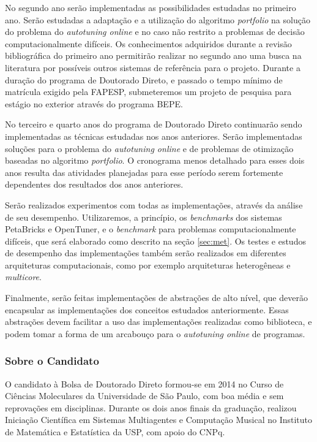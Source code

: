 \documentclass[a4paper, 11pt]{article}
\begin{document}
No segundo ano serão implementadas as possibilidades estudadas no primeiro ano.
Serão estudadas a adaptação e a utilização do algoritmo \emph{portfolio} na 
solução do problema do \emph{autotuning online} e no caso não restrito a 
problemas de decisão computacionalmente difíceis. Os conhecimentos adquiridos
durante a revisão bibliográfica do primeiro ano permitirão realizar no segundo 
ano uma busca na literatura por possíveis outros sistemas de referência para o 
projeto. Durante a duração do programa de Doutorado Direto, e passado o tempo 
mínimo de matrícula exigido pela FAPESP, submeteremos um projeto de pesquisa 
para estágio no exterior através do programa BEPE.

No terceiro e quarto anos do programa de Doutorado Direto continuarão sendo 
implementadas as técnicas estudadas nos anos anteriores. Serão implementadas
soluções para o problema do \emph{autotuning online} e de problemas de 
otimização baseadas no algoritmo \emph{portfolio}. O cronograma menos detalhado
para esses dois anos resulta das atividades planejadas para esse período serem
fortemente dependentes dos resultados dos anos anteriores.

Serão realizados experimentos com todas as implementações, através da análise 
de seu desempenho. Utilizaremos, a princípio, os \emph{benchmarks} dos sistemas
PetaBricks e OpenTuner, e o \emph{benchmark} para problemas computacionalmente
difíceis, que será elaborado como descrito na seção \ref{sec:met}. 
Os testes e estudos de desempenho das implementações também serão realizados 
em diferentes arquiteturas computacionais, como por exemplo arquiteturas 
heterogêneas e \emph{multicore}. 

Finalmente, serão feitas implementações de abstrações de alto
nível, que deverão encapsular as implementações dos conceitos estudados 
anteriormente. Essas abstrações devem facilitar a uso das implementações 
realizadas como biblioteca, e podem tomar a forma de um arcabouço para o 
\emph{autotuning online} de programas.

\subsubsection{Sobre o Candidato}

O candidato à Bolsa de Doutorado Direto formou-se em 2014 no Curso de Ciências
Moleculares da Universidade de São Paulo, com boa média e sem reprovações em
disciplinas. Durante os dois anos finais da graduação, realizou Iniciação 
Científica em Sistemas Multiagentes e Computação Musical no Instituto de 
Matemática e Estatística da USP, com apoio do CNPq. 
\end{document}
